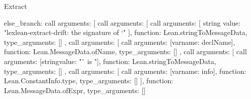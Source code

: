 \begin{lexlean}{Extract}
\begin{toolingmodule}
{{{{{{{{{{{{{{                                        else_branch: call{
                                          arguments: [
                                            call{
                                              arguments: [
                                                call{
                                                  arguments: [
                                                    string{
                                                      value: "lexlean-extract-drift: the signature of `"
                                                    }
                                                  ],
                                                  function: Lean.stringToMessageData,
                                                  type_arguments: []
                                                },
                                                call{
                                                  arguments: [
                                                    call{
                                                      arguments: [var{name: declName}],
                                                      function: Lean.MessageData.ofName,
                                                      type_arguments: []
                                                    },
                                                    call{
                                                      arguments: [
                                                        call{
                                                          arguments: [string{value: "` is "}],
                                                          function: Lean.stringToMessageData,
                                                          type_arguments: []
                                                        },
                                                        call{
                                                          arguments: [
                                                            call{
                                                              arguments: [var{name: info}],
                                                              function: Lean.ConstantInfo.type,
                                                              type_arguments: []
                                                            }
                                                          ],
                                                          function: Lean.MessageData.ofExpr,
                                                          type_arguments: []
                                                        }
}}}}}}}}}}}}}}}}}}
\end{toolingmodule}
\end{lexlean}
